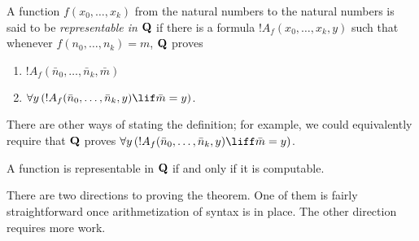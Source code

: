 \documentclass[../../include/open-logic-section]{subfiles}
\begin{document}
\begin{defn}
  A function $f(x_0,\ldots,x_k)$ from the natural numbers to
  the natural numbers is said to be {\em representable in $\mathbf{Q}$} if
  there is a formula $!A_f(x_0,\dots,x_k,y)$ such that whenever
  $f(n_0,\dots,n_k) = m$, $\mathbf{Q}$ proves
\begin{enumerate}
\item $!A_f(\bar n_0, \dots, \bar n_k,\bar m)$
\item $\lforall[y][(!A_f(\bar n_0, \dots, \bar n_k,y) \lif \bar m = y)]$.
\end{enumerate}
\end{defn}

There are other ways of stating the definition; for example, we could
equivalently require that $\mathbf{Q}$ proves $\lforall[y][(!A_f(\bar n_0, \dots,
\bar n_k,y) \liff \bar m = y)]$.

\begin{thm}
A function is representable in $\mathbf{Q}$ if and only if it is computable.
\end{thm}

There are two directions to proving the theorem. One of them is fairly
straightforward once arithmetization of syntax is in place. The other
direction requires more work.
\end{document}
